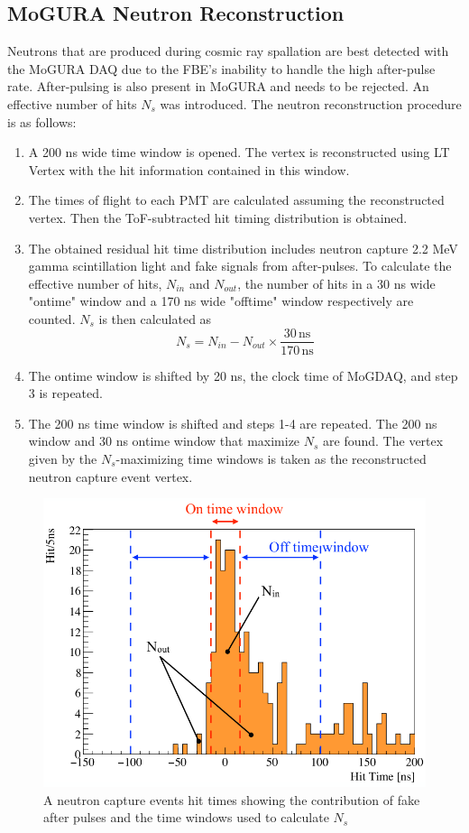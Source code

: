 \subsection{MoGURA Neutron Reconstruction}
\label{sec:mogura_neutron_reco}
Neutrons that are produced during cosmic ray spallation are best detected with the MoGURA DAQ due to the FBE's inability to handle the high after-pulse rate. After-pulsing is also present in MoGURA and needs to be rejected. An effective number of hits $N_s$ was introduced. The neutron reconstruction procedure is as follows:
\begin{enumerate}
	\item A 200 ns wide time window is opened. The vertex is reconstructed using LT Vertex with the hit information contained in this window.
	\item The times of flight to each PMT are calculated assuming the reconstructed vertex. Then the ToF-subtracted hit timing distribution is obtained.
	\item The obtained residual hit time distribution includes neutron capture 2.2 MeV gamma scintillation light and fake signals from after-pulses. To calculate the effective number of hits, $N_{in}$ and $N_{out}$, the number of hits in a 30 ns wide "ontime" window and a 170 ns wide "offtime" window respectively are counted. $N_s$ is then calculated as
	\begin{equation}
		N_s=N_{in}-N_{out}\times\frac{30\,\mathrm{ns}}{170\,\mathrm{ns}}
	\end{equation}
	\item The ontime window is shifted by 20 ns, the clock time of MoGDAQ, and step 3 is repeated.
	\item The 200 ns time window is shifted and steps 1-4 are repeated. The 200 ns window and 30 ns ontime window that maximize $N_s$ are found. The vertex given by the $N_s$-maximizing time windows is taken as the reconstructed neutron capture event vertex.
\end{enumerate}
\begin{figure}[htb]
	\centering
	\includegraphics[scale=0.4]{neutron_reco.png}
	\caption{A neutron capture events hit times showing the contribution of fake after pulses and the time windows used to calculate $N_s$}
	\label{fig:neutron_reco}
\end{figure}
